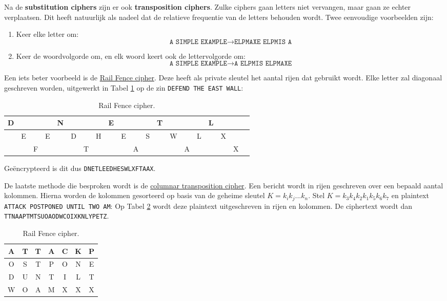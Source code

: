 \documentclass{report}
\begin{document}
	Na de \textbf{substitution ciphers} zijn er ook \textbf{transposition ciphers}. Zulke ciphers gaan letters niet vervangen, maar gaan ze echter verplaatsen. Dit heeft natuurlijk als nadeel dat de relatieve frequentie van de letters behouden wordt. Twee eenvoudige voorbeelden zijn:
	\begin{enumerate}
		\item Keer elke letter om:
			$$\texttt{A SIMPLE EXAMPLE} \rightarrow \texttt{ELPMAXE ELPMIS A}$$
		\item Keer de woordvolgorde om, en elk woord keert ook de lettervolgorde om:
			$$\texttt{A SIMPLE EXAMPLE} \rightarrow \texttt{A ELPMIS ELPMAXE}$$
	\end{enumerate}
	Een iets beter voorbeeld is de \underline{Rail Fence cipher}. Deze heeft als private sleutel het aantal rijen dat gebruikt wordt. Elke letter zal diagonaal geschreven worden, uitgewerkt in Tabel \ref{table:railfence} op de zin \texttt{DEFEND THE EAST WALL}: 
	\begin{table}[ht]
		\centering
		\begin{tabular}{|c|c|c|c|c|c|c|c|c|c|c|c|c|c|c|c|c|c|c|c|}
			\hline
			D & & & & N & & & & E & & & & T & & & & L & & \\
			\hline
			& E & & E & & D & & H & & E & & S & & W & & L & & X & \\
			\hline
			& & F & & & & T & & & & A & & & & A & & & & X \\
			\hline
		\end{tabular}
		\caption{Rail Fence cipher.}
		\label{table:railfence}
	\end{table}
	Geëncrypteerd is dit dus \texttt{DNETLEEDHESWLXFTAAX}.

	De laatste methode die besproken wordt is de \underline{columnar transposition cipher}. Een bericht wordt in rijen geschreven over een bepaald aantal kolommen. Hierna worden de kolommen gesorteerd op basis van de geheime sleutel $K = k_ik_j ... k_n$. Stel $K = k_3k_4k_2k_1k_5k_6k_7$ en plaintext \texttt{ATTACK POSTPONED UNTIL TWO AM}: Op Tabel \ref{table:columnartransposition} wordt deze plaintext uitgeschreven in rijen en kolommen. De ciphertext wordt dan \texttt{TTNAAPTMTSUOAODWCOIXKNLYPETZ}.
	\begin{table}[ht]
		\centering
		\begin{tabular}{|c|c|c|c|c|c|c|}
			\hline
			A & T & T & A & C & K & P \\
			\hline
			O & S & T & P & O & N & E \\
			\hline
			D & U & N & T & I & L & T \\
			\hline
			W & O & A & M & X & X & X \\
			\hline
		\end{tabular}
		\caption{Rail Fence cipher.}
		\label{table:columnartransposition}
	\end{table}
\end{document}

